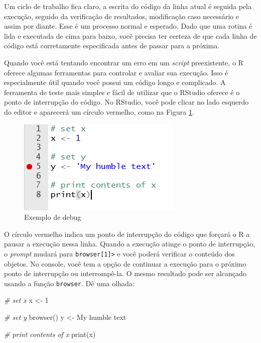\documentclass[
  11pt,
]{book}
\newenvironment{Shaded}{\begin{snugshade}}{\end{snugshade}}
\newcommand{\CommentTok}[1]{\textcolor[rgb]{0.37,0.37,0.37}{\textit{#1}}}
\newcommand{\DecValTok}[1]{\textcolor[rgb]{0.06,0.06,0.06}{#1}}
\newcommand{\FunctionTok}[1]{\textcolor[rgb]{0,0,0}{#1}}
\newcommand{\NormalTok}[1]{#1}
\newcommand{\OtherTok}[1]{\textcolor[rgb]{0.37,0.37,0.37}{#1}}
\newcommand{\StringTok}[1]{\textcolor[rgb]{0.5,0.5,0.5}{#1}}
\begin{document}
Um ciclo de trabalho fica claro, a escrita do código da linha atual é seguida pela execução, seguido da verificação de resultados, modificação caso necessário e assim por diante. Esse é um processo normal e esperado. Dado que uma rotina é lida e executada de cima para baixo, você precisa ter certeza de que cada linha de código está corretamente especificada antes de passar para a próxima.

Quando você está tentando encontrar um erro em um \emph{script} preexistente, o R oferece algumas ferramentas para controlar e avaliar sua execução. Isso é especialmente útil quando você possui um código longo e complicado. A ferramenta de teste mais simples e fácil de utilizar que o RStudio oferece é o ponto de interrupção do código. No RStudio, você pode clicar no lado esquerdo do editor e aparecerá um círculo vermelho, como na Figura \ref{fig:example-debug}.

\begin{figure}[!htbp]

{\centering \includegraphics[width=0.6\linewidth]{00-text-resources/figs/RStudio_example_debug} 

}

\caption{Exemplo de debug}\label{fig:example-debug}
\end{figure}

O círculo vermelho indica um ponto de interrupção do código que forçará o R a pausar a execução nessa linha. Quando a execução atinge o ponto de interrupção, o \emph{prompt} mudará para \texttt{browser{[}1{]}\textgreater{}} e você poderá verificar o conteúdo dos objetos. No console, você tem a opção de continuar a execução para o próximo ponto de interrupção ou interrompê-la. O mesmo resultado pode ser alcançado usando a função \texttt{browser}. Dê uma olhada:

\begin{Shaded}
\begin{Highlighting}[]
\CommentTok{\# set x}
\NormalTok{x }\OtherTok{\textless{}{-}} \DecValTok{1}

\CommentTok{\# set y}
\FunctionTok{browser}\NormalTok{()}
\NormalTok{y }\OtherTok{\textless{}{-}} \StringTok{\textquotesingle{}My humble text\textquotesingle{}}

\CommentTok{\# print contents of x}
\FunctionTok{print}\NormalTok{(x)}
\end{Highlighting}
\end{Shaded}
\end{document}
